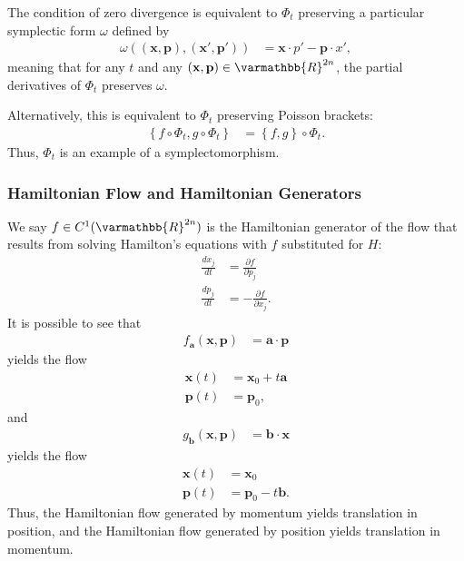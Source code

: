 \documentclass[12pt]{extarticle}
\newcommand{\R}{\varmathbb{R}}
\newcommand{\set}[1]{\left\{#1\right\}}
\theoremstyle{plain}
\theoremstyle{definition}
\theoremstyle{remark}
\renewcommand{\newline}{\hfill\break}
\begin{document}
  The condition of zero divergence is equivalent to $\Phi_t$ preserving a particular symplectic form $\omega$ defined by
  \begin{align*}
    \omega\left((\mathbf{x},\mathbf{p}),(\mathbf{x}',\mathbf{p}')\right) &= \mathbf{x}\cdot p' - \mathbf{p}\cdot x',
  \end{align*}
  meaning that for any $t$ and any $(\mathbf{x},\mathbf{p})\in \R^{2n}$, the partial derivatives of $\Phi_t$ preserves $\omega$.\newline

  Alternatively, this is equivalent to $\Phi_t$ preserving Poisson brackets:
  \begin{align*}
    \set{f\circ \Phi_t,g\circ\Phi_t} &= \set{f,g}\circ \Phi_t.
  \end{align*}
  Thus, $\Phi_t$ is an example of a symplectomorphism.
  \subsubsection{Hamiltonian Flow and Hamiltonian Generators}%
  We say $f\in C^{1}(\R^{2n})$ is the Hamiltonian generator of the flow that results from solving Hamilton's equations with $f$ substituted for $H$:
  \begin{align*}
    \frac{dx_j}{dt} &= \frac{\partial f}{\partial p_j}\\
    \frac{dp_j}{dt} &= -\frac{\partial f}{\partial x_j}.
  \end{align*}
  It is possible to see that
  \begin{align*}
    f_{\mathbf{a}}(\mathbf{x},\mathbf{p}) &= \mathbf{a}\cdot \mathbf{p}
  \end{align*}
  yields the flow
  \begin{align*}
    \mathbf{x}(t) &= \mathbf{x}_0 + t\mathbf{a}\\
    \mathbf{p}(t) &= \mathbf{p}_0,
  \end{align*}
  and
  \begin{align*}
    g_{\mathbf{b}}(\mathbf{x},\mathbf{p}) &= \mathbf{b}\cdot \mathbf{x}
  \end{align*}
  yields the flow
  \begin{align*}
    \mathbf{x}(t) &= \mathbf{x}_0\\
    \mathbf{p}(t) &= \mathbf{p}_0 - t\mathbf{b}.
  \end{align*}
  Thus, the Hamiltonian flow generated by momentum yields translation in position, and the Hamiltonian flow generated by position yields translation in momentum.\newline
\end{document}
